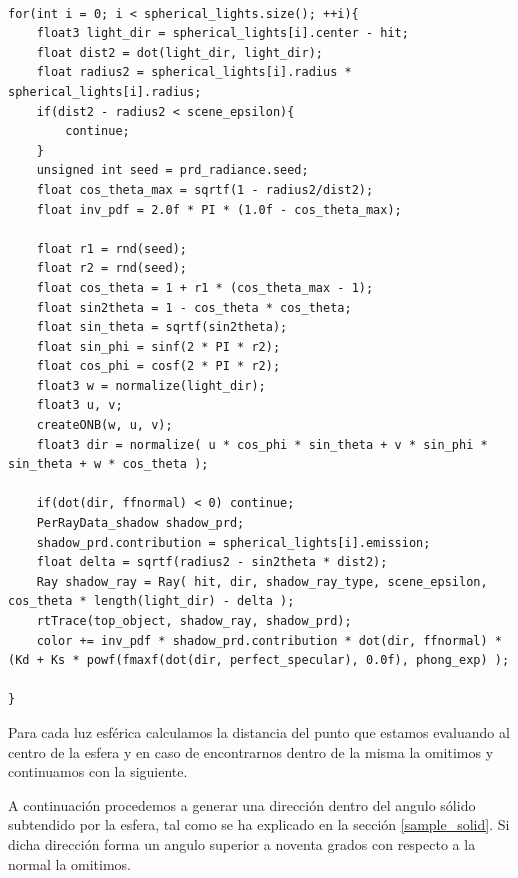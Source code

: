 \begin{lstlisting}

for(int i = 0; i < spherical_lights.size(); ++i){
	float3 light_dir = spherical_lights[i].center - hit;
	float dist2 = dot(light_dir, light_dir);
	float radius2 = spherical_lights[i].radius * spherical_lights[i].radius;
	if(dist2 - radius2 < scene_epsilon){
		continue;
	}
	unsigned int seed = prd_radiance.seed;
	float cos_theta_max = sqrtf(1 - radius2/dist2);
	float inv_pdf = 2.0f * PI * (1.0f - cos_theta_max);
	
	float r1 = rnd(seed);
	float r2 = rnd(seed);
	float cos_theta = 1 + r1 * (cos_theta_max - 1);
	float sin2theta = 1 - cos_theta * cos_theta;
	float sin_theta = sqrtf(sin2theta);
	float sin_phi = sinf(2 * PI * r2);
	float cos_phi = cosf(2 * PI * r2);
	float3 w = normalize(light_dir);
	float3 u, v;
	createONB(w, u, v);
	float3 dir = normalize( u * cos_phi * sin_theta + v * sin_phi * sin_theta + w * cos_theta );

	if(dot(dir, ffnormal) < 0) continue;
	PerRayData_shadow shadow_prd;
	shadow_prd.contribution = spherical_lights[i].emission;
	float delta = sqrtf(radius2 - sin2theta * dist2);
	Ray shadow_ray = Ray( hit, dir, shadow_ray_type, scene_epsilon, cos_theta * length(light_dir) - delta );
	rtTrace(top_object, shadow_ray, shadow_prd);
	color += inv_pdf * shadow_prd.contribution * dot(dir, ffnormal) * (Kd + Ks * powf(fmaxf(dot(dir, perfect_specular), 0.0f), phong_exp) );

}
\end{lstlisting}

Para cada luz esférica calculamos la distancia del punto que estamos evaluando al centro de la esfera y en caso de encontrarnos dentro de la misma la omitimos y continuamos con la siguiente.

\medskip


A continuación procedemos a generar una dirección dentro del angulo sólido subtendido por la esfera, tal como se ha explicado en la sección \ref{sample_solid}. Si dicha dirección forma un angulo superior a noventa grados con respecto a la normal la omitimos.

